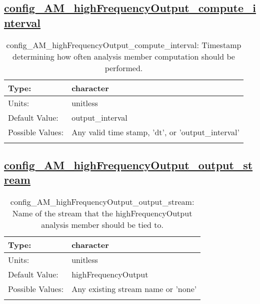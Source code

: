 \subsection[config\_AM\_highFrequencyOutput\_compute\_interval]{\hyperref[sec:nm_tab_AM_highFrequencyOutput]{config\_AM\_highFrequencyOutput\_compute\_interval}}
\label{subsec:nm_sec_config_AM_highFrequencyOutput_compute_interval}
\begin{center}
\begin{longtable}{| p{2.0in} || p{4.0in} |}
    \hline
    Type: & character \\
    \hline
    Units: & \si{unitless} \\
    \hline
    Default Value: & output\_interval \\
    \hline
    Possible Values: & Any valid time stamp, 'dt', or 'output\_interval' \\
    \hline
    \caption{config\_AM\_highFrequencyOutput\_compute\_interval: Timestamp determining how often analysis member computation should be performed.}
\end{longtable}
\end{center}
\subsection[config\_AM\_highFrequencyOutput\_output\_stream]{\hyperref[sec:nm_tab_AM_highFrequencyOutput]{config\_AM\_highFrequencyOutput\_output\_stream}}
\label{subsec:nm_sec_config_AM_highFrequencyOutput_output_stream}
\begin{center}
\begin{longtable}{| p{2.0in} || p{4.0in} |}
    \hline
    Type: & character \\
    \hline
    Units: & \si{unitless} \\
    \hline
    Default Value: & highFrequencyOutput \\
    \hline
    Possible Values: & Any existing stream name or 'none' \\
    \hline
    \caption{config\_AM\_highFrequencyOutput\_output\_stream: Name of the stream that the highFrequencyOutput analysis member should be tied to.}
\end{longtable}
\end{center}

